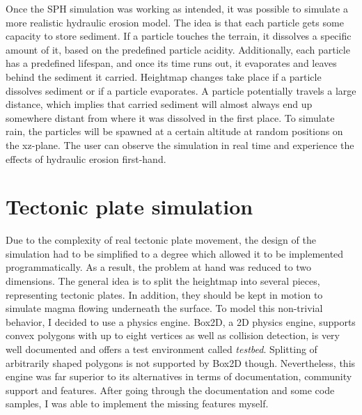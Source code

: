 \documentclass[11pt,a4paper,twoside,openright]{report}
\begin{document}
Once the SPH simulation was working as intended, it was possible to simulate a more realistic hydraulic erosion model. The idea is that each particle gets some capacity to store sediment. If a particle touches the terrain, it dissolves a specific amount of it, based on the predefined particle acidity. Additionally, each particle has a predefined lifespan, and once its time runs out, it evaporates and leaves behind the sediment it carried. Heightmap changes take place if a particle dissolves sediment or if a particle evaporates. A particle potentially travels a large distance, which implies that carried sediment will almost always end up somewhere distant from where it was dissolved in the first place. To simulate rain, the particles will be spawned at a certain altitude at random positions on the xz-plane. The user can observe the simulation in real time and experience the effects of hydraulic erosion first-hand.

\section{Tectonic plate simulation}
\label{sec:tectonicplatesimulation}
Due to the complexity of real tectonic plate movement, the design of the simulation had to be simplified to a degree which allowed it to be implemented programmatically. As a result, the problem at hand was reduced to two dimensions. The general idea is to split the heightmap into several pieces, representing tectonic plates. In addition, they should be kept in motion to simulate magma flowing underneath the surface. To model this non-trivial behavior, I decided to use a physics engine. Box2D, a 2D physics engine, supports convex polygons with up to eight vertices as well as collision detection, is very well documented and offers a test environment called \emph{testbed}. Splitting of arbitrarily shaped polygons is not supported by Box2D though. Nevertheless, this engine was far superior to its alternatives in terms of documentation, community support and features. After going through the documentation and some code samples, I was able to implement the missing features myself.
\end{document}
